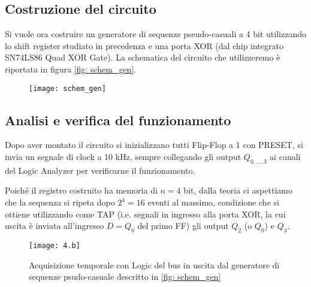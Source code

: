 \documentclass[10pt, a4paper, italian]{article}
\begin{document}
\subsection{Costruzione del circuito}
Si vuole ora costruire un generatore di sequenze pseudo-casuali a 4 bit
utilizzando lo shift register studiato in precedenza e una porta XOR (dal chip
integrato SN74LS86 Quad XOR Gate).
La schematica del circuito che utilizzeremo è riportata in figura
\cref{fig: schem_gen}.
\begin{figure}[htbp]
\centering
	\texttt{[image: schem\_gen]}
\end{figure}

\subsection{Analisi e verifica del funzionamento}
Dopo aver montato il circuito si inizializzano tutti Flip-Flop a 1 con
PRESET, si invia un segnale di clock a 10 kHz, sempre collegando gli output
$Q_{0,\ldots, 3}$ ai canali del Logic Analyzer per verificarne il
funzionamento.

Poiché il registro costruito ha memoria di $n = 4$ bit, dalla teoria ci
aspettiamo che la sequenza si ripeta dopo $2^4 = 16$ eventi al massimo,
condizione che si ottiene utilizzando come TAP (i.e. segnali in ingresso alla
porta XOR, la cui uscita è inviata all'ingresso $D = Q_0$ del primo FF) gli
output $Q_2$ (o $Q_0$) e $Q_3$.
\begin{figure}[htbp]
\centering
	\texttt{[image: 4.b]}
	\caption{Acquisizione temporale con Logic del bus in uscita dal generatore
	di sequenze psudo-casuale descritto in \cref{fig: schem_gen}
	\label{fig: TAP_23}}
\end{figure}
\end{document}
